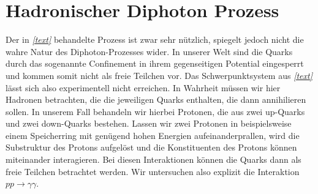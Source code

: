 \section{Hadronischer Diphoton Prozess}
Der in \textit{\autoref{text}} behandelte Prozess ist zwar sehr nützlich, spiegelt jedoch nicht die wahre Natur des Diphoton-Prozesses wider. In unserer Welt sind die Quarks durch das sogenannte Confinement in ihrem gegenseitigen Potential eingesperrt und kommen somit nicht als freie Teilchen vor. Das Schwerpunktsystem aus \textit{\autoref{text}} lässt sich also experimentell nicht erreichen. In Wahrheit müssen wir hier Hadronen betrachten, die die jeweiligen Quarks enthalten, die dann annihilieren sollen. In unserem Fall behandeln wir hierbei Protonen, die aus zwei up-Quarks und zwei down-Quarks bestehen. Lassen wir zwei Protonen in beispielsweise einem Speicherring mit genügend hohen Energien aufeinanderprallen, wird die Substruktur des Protons aufgelöst und die Konstituenten des Protons können miteinander interagieren. Bei diesen Interaktionen können die Quarks dann als freie Teilchen betrachtet werden. Wir untersuchen also explizit die Interaktion $pp \rightarrow \gamma \gamma$. 

